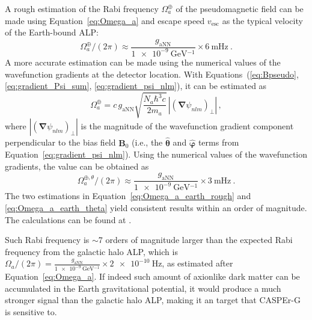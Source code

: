 A rough estimation of the Rabi frequency $\Omega_a^{\oplus}$ of the pseudomagnetic field can be made using Equation~\eqref{eq:Omega_a} and escape speed $v_\mathrm{esc}$ as the typical velocity of the Earth-bound ALP:
\begin{equation}
    \Omega_a^{\oplus} / (2 \pi)\approx \frac{g_\mathrm{aNN}}{\SI{1e-9}{\GeV^{-1}}} \times \SI{6}{\mHz}~.
    \label{eq:Omega_a_earth_rough}
\end{equation}
A more accurate estimation can be made using the numerical values of the wavefunction gradients at the detector location.
With Equations~(\ref{eq:Bpseudo}, \ref{eq:gradient_Psi_sum}, \ref{eq:gradient_psi_nlm}), it can be estimated as
\begin{equation}
    \Omega_a^{\oplus} = c\, g_\mathrm{aNN} \sqrt{\frac{N_a \hbar^3 c}{2 m_a}}\,\left|\left(\boldsymbol{\nabla}\psi_{nlm}\right)_\perp\right|
    \,,\label{eq:Omega_a_earth}
\end{equation}
where $\left|(\boldsymbol{\nabla}\psi_{nlm})_\perp\right|$ is the magnitude of the wavefunction gradient component perpendicular to the bias field $\mathbf{B}_0$ (i.e., the $\hat{\boldsymbol{\theta}}$ and $\hat{\boldsymbol{\varphi}}$ terms from Equation~\eqref{eq:gradient_psi_nlm}).
Using the numerical values of the wavefunction gradients, the value can be obtained as
\begin{equation}
    \Omega_a^{\oplus, \theta} / (2 \pi)\approx \frac{g_\mathrm{aNN}}{\SI{1e-9}{\GeV^{-1}}} \times \SI{3}{\mHz}~.
    \label{eq:Omega_a_earth_theta}
\end{equation}
The two estimations in Equation~\eqref{eq:Omega_a_earth_rough} and \eqref{eq:Omega_a_earth_theta} yield consistent results within an order of magnitude.
The calculations can be found at .

Such Rabi frequency is $\sim$7 orders of magnitude larger than the expected Rabi frequency from the galactic halo ALP, which is $\Omega_a/(2\pi)=\frac{g_\mathrm{aNN}}{\SI{1e-9}{\GeV^{-1}}}\times\SI{2e-10}{\Hz}$, as estimated after Equation~\eqref{eq:Omega_a}.
If indeed such amount of axionlike dark matter can be accumulated in the Earth gravitational potential, it would produce a much stronger signal than the galactic halo ALP, making it an target that CASPEr-G is sensitive to.

